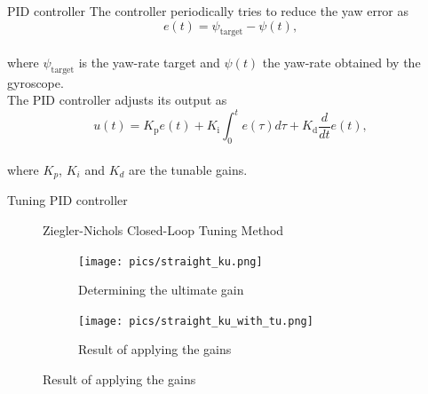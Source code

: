 \documentclass{beamer}
\begin{document}
\begin{frame}[noframenumbering]{PID controller}
The controller periodically tries to reduce the yaw error as \\

\begin{equation}
e(t) = \psi_{\text{target}} - \psi(t),
\end{equation} \\
\vspace{1em}
\noindent
where $\psi_{\text{target}}$ is the yaw-rate target and $\psi(t)$ the yaw-rate obtained by the gyroscope. \\
\vspace{1em}
The PID controller adjusts its output as \\

\begin{equation}
u(t) = K_{\text{p}}e(t) + K_{\text{i}} \int_{0}^{t}e(\tau)d\tau + K_{\text{d}}\frac{d}{dt}e(t),
\end{equation} \\
\vspace{1em}
\noindent
where $K_{p}$, $K_{i}$ and $K_{d}$ are the tunable gains.
\end{frame}

\begin{frame}[noframenumbering]{Tuning PID controller}
	\begin{figure}
	Ziegler-Nichols Closed-Loop Tuning Method
		\begin{center}
		\begin{subfigure}[b]{0.49\textwidth}
			\texttt{[image: pics/straight\_ku.png]}
			\caption*{Determining the ultimate gain}
		\end{subfigure}
		\begin{subfigure}[b]{0.49\textwidth}
			\texttt{[image: pics/straight\_ku\_with\_tu.png]}
			\caption*{Result of applying the gains}
		\end{subfigure}
		\end{center}
	\end{figure}
\end{frame}
\end{document}
